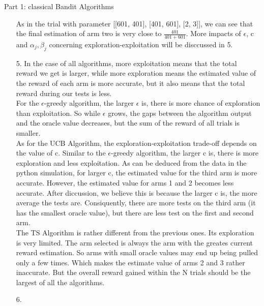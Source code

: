 \documentclass{article}
\begin{document}
\begin{homeworkProblem}{Part 1: classical Bandit Algorithms}
\begin{enumerate}
        As in the trial with parameter [[601, 401], [401, 601], [2, 3]], we can see that the final estimation of arm two is very close to $\frac{401}{401+601}$.
        More impacts of $\epsilon$, c and $\alpha_j,\beta_j$ concerning exploration-exploitation will be disccussed in 5.
        \item[5.]
        In the case of all algorithms, more exploitation means that the total reward we get is larger, while more exploration means
        the estimated value of the reward of each arm is more accurate, but it also means that the total reward during our tests is less.\\
        For the $\epsilon$-greedy algorithm, the larger $\epsilon$ is, there is more chance of exploration than exploitation.
        So while $\epsilon$ grows, the gaps between the algorithm output and the oracle value decreases, but the sum of the reward of all trials is smaller.\\
        As for the UCB Algorithm, the exploration-exploitation trade-off depends on the value of c.
        Similar to the $\epsilon$-greedy algorithm, the larger c is, there is more exploration and less exploitation.
        As can be deduced from the data in the python simulation, for larger c, the estimated value for the third arm is more accurate.
        However, the estimated value for arms 1 and 2 becomes less accurate. After diccussion, we believe this is because the larger c is, 
        the more average the tests are. Consiquently, there are more tests on the third arm (it has the smallest oracle value), 
        but there are less test on the first and second arm.\\
        The TS Algorithm is rather different from the previous ones. Its exploration is very limited. 
        The arm selected is always the arm with the greates current reward estimation. So arms with small oracle values may end up being pulled only a few times.
        Which makes the estimate value of arms 2 and 3 rather inaccurate. But the overall reward gained within the N trials should be the largest of all the algorithms.
        \item[6.]

    \end{enumerate}
\end{homeworkProblem}
\pagebreak
\end{document}
